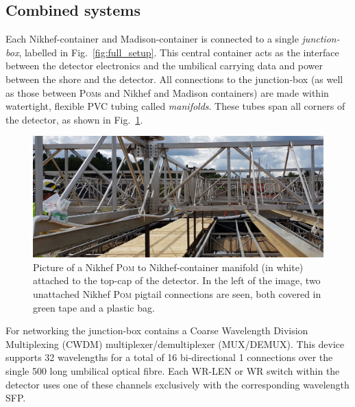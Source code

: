 \subsection{Combined systems} %
\label{sec:daq_hard_combined} %

Each Nikhef-container and Madison-container is connected to a single \emph{junction-box}, labelled
in Fig.~\ref{fig:full_setup}. This central container acts as the interface between the detector
electronics and the umbilical carrying data and power between the shore and the detector. All
connections to the junction-box (as well as those between \textsc{Pom}s and Nikhef and Madison
containers) are made within watertight, flexible PVC tubing called \emph{manifolds}. These tubes
span all corners of the \chipsfive detector, as shown in Fig.~\ref{fig:manifold}.

\begin{figure} %
    \includegraphics[width=\textwidth]{diagrams/5-daq/manifold.pdf}
    \caption[Picture of a manifold connection within the \chipsfive detector]
    {Picture of a Nikhef \textsc{Pom} to Nikhef-container manifold (in white) attached to the
        top-cap of the \chipsfive detector. In the left of the image, two unattached Nikhef
        \textsc{Pom} pigtail connections are seen, both covered in green tape and a plastic bag.}
    \label{fig:manifold}
\end{figure}

For networking the junction-box contains a Coarse Wavelength Division Multiplexing (CWDM)
multiplexer/demultiplexer (MUX/DEMUX). This device supports 32 wavelengths for a total of 16
bi-directional \unit{1}{} connections over the single \unit{500}{} long umbilical
optical fibre. Each WR-LEN or WR switch within the detector uses one of these channels exclusively
with the corresponding wavelength SFP.

